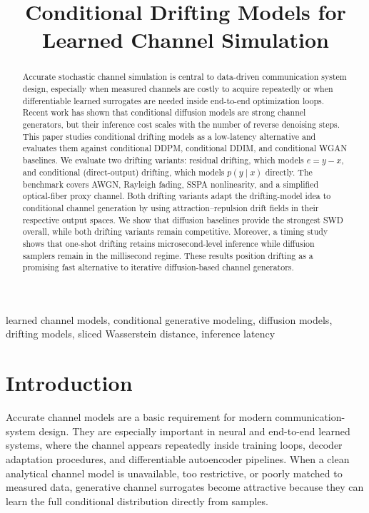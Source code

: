 \documentclass[conference]{IEEEtran}
\title{Conditional Drifting Models for Learned Channel Simulation}
\author{
\IEEEauthorblockN{Rick Fritschek and Rafael F. Schaefer}
\IEEEauthorblockA{TU Dresden, Germany}
}
\begin{document}
\maketitle

\begin{abstract}
Accurate stochastic channel simulation is central to data-driven communication system design, especially when measured channels are costly to acquire repeatedly or when differentiable learned surrogates are needed inside end-to-end optimization loops.
Recent work has shown that conditional diffusion models are strong channel generators, but their inference cost scales with the number of reverse denoising steps.
This paper studies conditional drifting models as a low-latency alternative and evaluates them against conditional DDPM, conditional DDIM, and conditional WGAN baselines.
We evaluate two drifting variants: residual drifting, which models \(e = y - x\), and conditional (direct-output) drifting, which models \(p(y\mid x)\) directly.
The benchmark covers AWGN, Rayleigh fading, SSPA nonlinearity, and a simplified optical-fiber proxy channel.
Both drifting variants adapt the drifting-model idea to conditional channel generation by using attraction--repulsion drift fields in their respective output spaces.
We show that diffusion baselines provide the strongest SWD overall, while both drifting variants remain competitive. Moreover, a timing study shows that one-shot drifting retains microsecond-level inference while diffusion samplers remain in the millisecond regime.
These results position drifting as a promising fast alternative to iterative diffusion-based channel generators.
\end{abstract}

\begin{IEEEkeywords}
learned channel models, conditional generative modeling, diffusion models, drifting models, sliced Wasserstein distance, inference latency
\end{IEEEkeywords}

\section{Introduction}
Accurate channel models are a basic requirement for modern communication-system design.
They are especially important in neural and end-to-end learned systems, where the channel appears repeatedly inside training loops, decoder adaptation procedures, and differentiable autoencoder pipelines.
When a clean analytical channel model is unavailable, too restrictive, or poorly matched to measured data, generative channel surrogates become attractive because they can learn the full conditional distribution directly from samples.
\end{document}
